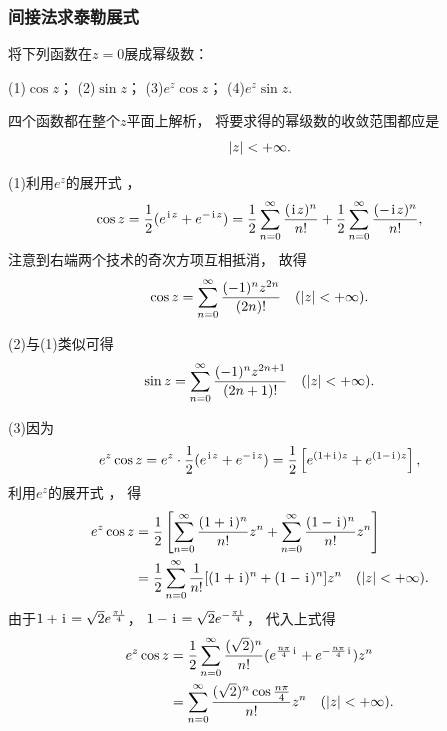 \subsubsection{间接法求泰勒展式}
\begin{example}
将下列函数在\(z = 0\)展成幂级数：

(1)\(\cos z\)； \hfill (2)\(\sin z\)； \hfill (3)\(e^z \cos z\)； \hfill (4)\(e^z \sin z\).
\begin{solution}
四个函数都在整个\(z\)平面上解析，
将要求得的幂级数的收敛范围都应是\begin{equation*}
	\abs{z}<+\infty.
\end{equation*}

(1)利用\(e^z\)的展开式 ，
\begin{equation*}
	\cos z = \frac12 (e^{\kern1pt\mathrm{i}\kern1pt z} + e^{-\kern1pt\mathrm{i}\kern1pt z})
	= \frac12 \sum_{n=0}^\infty \frac{(\kern1pt\mathrm{i}\kern1pt z)^n}{n!} + \frac12 \sum_{n=0}^\infty \frac{(-\kern1pt\mathrm{i}\kern1pt z)^n}{n!},
\end{equation*}
注意到右端两个技术的奇次方项互相抵消，
故得\begin{equation}\label{equation:解析函数的级数表示.余弦函数的泰勒展式}
	\cos z = \sum_{n=0}^\infty \frac{(-1)^n z^{2n}}{(2n)!}
	\quad(\abs{z}<+\infty).
\end{equation}

(2)与(1)类似可得\begin{equation}\label{equation:解析函数的级数表示.正弦函数的泰勒展式}
	\sin z = \sum_{n=0}^\infty \frac{(-1)^n z^{2n+1}}{(2n+1)!}
	\quad(\abs{z}<+\infty).
\end{equation}

(3)因为\begin{equation*}
	e^z \cos z = e^z \cdot \frac12 (e^{\kern1pt\mathrm{i}\kern1pt z} + e^{-\kern1pt\mathrm{i}\kern1pt z})
	= \frac12 \left[e^{(1+\kern1pt\mathrm{i}\kern1pt)z} + e^{(1-\kern1pt\mathrm{i}\kern1pt)z}\right],
\end{equation*}
利用\(e^z\)的展开式 ，
得\begin{align*}
	e^z \cos z
	&= \frac12 \left[
			\sum_{n=0}^\infty \frac{(1+\kern1pt\mathrm{i}\kern1pt)^n}{n!} z^n
			+ \sum_{n=0}^\infty \frac{(1-\kern1pt\mathrm{i}\kern1pt)^n}{n!} z^n
		\right] \\
	&= \frac12 \sum_{n=0}^\infty \frac1{n!} [(1+\kern1pt\mathrm{i}\kern1pt)^n+(1-\kern1pt\mathrm{i}\kern1pt)^n] z^n
	\quad(\abs{z}<+\infty).
\end{align*}
由于\(1+\kern1pt\mathrm{i}\kern1pt=\sqrt{2} e^{\frac{\pi\kern1pt\mathrm{i}\kern1pt}{4}}\)，
\(1-\kern1pt\mathrm{i}\kern1pt=\sqrt{2} e^{-\frac{\pi\kern1pt\mathrm{i}\kern1pt}{4}}\)，
代入上式得\begin{equation}
	\begin{split}
		e^z \cos z
		&= \frac12
			\sum_{n=0}^\infty
			\frac{(\sqrt{2})^n}{n!}
			(e^{\frac{n\pi}{4}\kern1pt\mathrm{i}\kern1pt}+e^{-\frac{n\pi}{4}\kern1pt\mathrm{i}\kern1pt}) z^n \\
		&= \sum_{n=0}^\infty \frac{(\sqrt{2})^n \cos\frac{n\pi}{4}}{n!} z^n
		\quad(\abs{z}<+\infty).
	\end{split}
\end{equation}


\end{solution}
\end{example}
